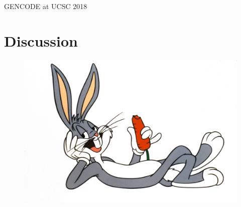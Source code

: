 \documentclass[10pt,
               hyperref={bookmarks=false,
                         bookmarksopen=false,
                         colorlinks=true,
                         linkcolor=blue,
                         urlcolor=blue},
               xcolor={svgnames,table}]{beamer}
\newcommand{\sectionframe}[1]{
  \begin{frame}{\thetitle}
    \section{#1}
  \end{frame}
}
\newcommand{\thetitle}{GENCODE at UCSC 2018}
\begin{document}

\begin{frame}{\thetitle}
  \section{Discussion}
  \begin{figure}[b]
    \includegraphics[scale=0.20]{images/Bugs.jpg}
  \end{figure}
\end{frame}

\end{document}
